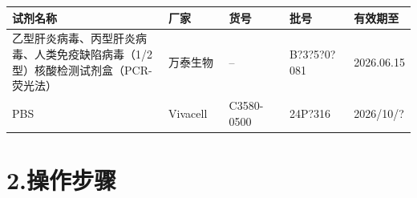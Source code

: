 \documentclass[UTF8,10pt,a4paper,fontset=fandol]{ctexart}
\newcommand{\fieldvalue}[1]{#1}
\newcommand{\handwritten}[1]{#1}
\begin{document}
\begin{tabular}{|p{0.39\linewidth}|p{0.15\linewidth}|p{0.15\linewidth}|p{0.16\linewidth}|p{0.15\linewidth}|}
\hline
试剂名称 & 厂家 & 货号 & 批号 & 有效期至 \\ \hline
乙型肝炎病毒、丙型肝炎病毒、人类免疫缺陷病毒（1/2 型）核酸检测试剂盒（PCR-荧光法）
& 万泰生物 &
\fieldvalue{\handwritten{--}} &
\fieldvalue{\handwritten{B?3?5?0? 081}} &
\fieldvalue{\handwritten{2026.06.15}}
\\ \hline
PBS & Vivacell & C3580-0500 &
\fieldvalue{\handwritten{24P?316}} &
\fieldvalue{\handwritten{2026/10/?}}
\\ \hline
\end{tabular}

\section*{2.\quad 操作步骤}
\end{document}
